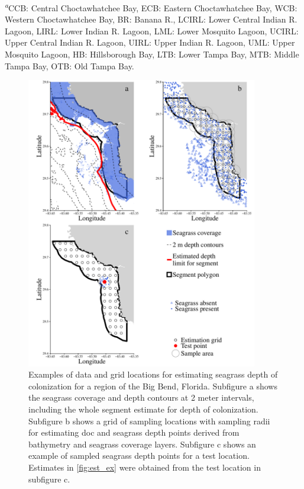 \documentclass[letterpaper,12pt,oneside]{article}\usepackage[]{graphicx}\usepackage[]{color}
\begin{document}
\begin{table}[!tbp]
\textsuperscript{\textit{a}}\footnotesize CCB: Central Choctawhatchee Bay, ECB: Eastern Choctawhatchee Bay, WCB: Western Choctawhatchee Bay, BR: Banana R., LCIRL: Lower Central Indian R. Lagoon, LIRL: Lower Indian R. Lagoon, LML: Lower Mosquito Lagoon, UCIRL: Upper Central Indian R. Lagoon, UIRL: Upper Indian R. Lagoon, UML: Upper Mosquito Lagoon, HB: Hillsborough Bay, LTB: Lower Tampa Bay, MTB: Middle Tampa Bay, OTB: Old Tampa Bay.\end{table}


\clearpage




\begin{figure}
\centering
\includegraphics[width=0.9\textwidth]{figs/Fig1.pdf}
\caption{Examples of data and grid locations for estimating seagrass depth of colonization for a region of the Big Bend, Florida.  Subfigure a shows the seagrass coverage and depth contours at 2 meter intervals, including the whole segment estimate for depth of colonization. Subfigure b shows a grid of sampling locations with sampling radii for estimating \ac{doc} and seagrass depth points derived from bathymetry and seagrass coverage layers.  Subfigure c shows an example of sampled seagrass depth points for a test location.  Estimates in \cref{fig:est_ex} were obtained from the test location in subfigure c.}
\label{fig:buff_ex}
\end{figure}
\end{document}
